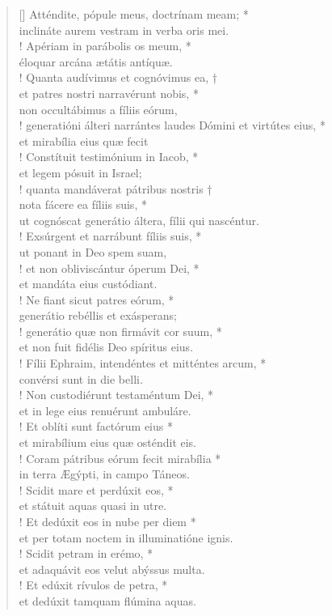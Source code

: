 \begin{verse}[\versewidth]
Atténdite, pópule meus, doctrínam meam; *\\
inclináte aurem vestram in verba oris mei.\\!
\vin Apériam in parábolis os meum, *\\
\vin éloquar arcána ætátis antíquæ.\\!
Quanta audívimus et cognóvimus ea, †\\
et patres nostri narravérunt nobis, *\\
non occultábimus a fíliis eórum,\\!
\vin generatióni álteri \verselinebreak narrántes laudes Dómini et virtútes eius, *\\
\vin et mirabília eius quæ fecit\\!
Constítuit testimónium in Iacob, *\\
et legem pósuit in Israel;\\!
\vin quanta mandáverat pátribus nostris †\\
\vin nota fácere ea fíliis suis, *\\
\vin ut cognóscat generátio áltera, fílii qui nascéntur.\\!
Exsúrgent et narrábunt fíliis suis, *\\
ut ponant in Deo spem suam,\\!
\vin et non obliviscántur óperum Dei, *\\
\vin et mandáta eius custódiant.\\!
Ne fiant sicut patres eórum, *\\
generátio rebéllis et exásperans;\\!
\vin generátio quæ non firmávit cor suum, *\\
\vin et non fuit fidélis Deo spíritus eius.\\!
Fílii Ephraim, intendéntes et mitténtes arcum, *\\
convérsi sunt in die belli.\\!
\vin Non custodiérunt testaméntum Dei, *\\
\vin et in lege eius renuérunt ambuláre.\\!
Et oblíti sunt factórum eius *\\
et mirabílium eius quæ osténdit eis.\\!
\vin Coram pátribus eórum fecit mirabília *\\
\vin in terra Ægýpti, in campo Táneos.\\!
Scidit mare et perdúxit eos, *\\
et státuit aquas quasi in utre.\\!
\vin Et dedúxit eos in nube per diem *\\
\vin et per totam noctem in illuminatióne ignis.\\!
Scidit petram in erémo, *\\
et adaquávit eos velut abýssus multa.\\!
\vin Et edúxit rívulos de petra, *\\
\vin et dedúxit tamquam flúmina aquas.\\
\end{verse}
